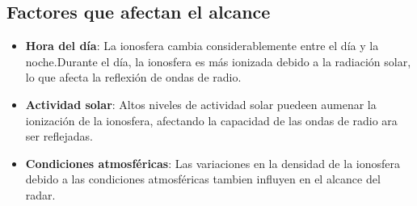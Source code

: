 \documentclass[12pt]{article}
\begin{document}
\subsection{Factores que afectan el alcance}
\begin{itemize}
    \item \textbf{Hora del día}: La ionosfera cambia considerablemente entre el día y 
    la noche.Durante el día, la ionosfera es más ionizada debido a la radiación solar, 
    lo que afecta la reflexión de ondas de radio.
    \item \textbf{Actividad solar}: Altos niveles de actividad solar puedeen aumenar la
    ionización de la ionosfera, afectando la capacidad de las ondas de radio ara ser reflejadas.
    \item \textbf{Condiciones atmosféricas}: Las variaciones en la densidad de la ionosfera 
    debido a las condiciones atmosféricas tambien influyen en el alcance del radar.
\end{itemize}
\end{document}

